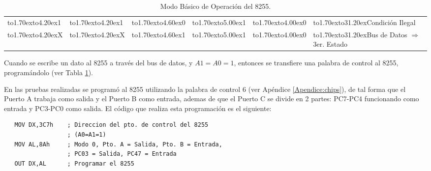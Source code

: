 \begin{table}[!htb]
\begin{tabular}{|l|l|l|l|l|l|}
\cline{1-6}
\vbox to1.70ex{\vspace{1pt}\vfil\hbox to4.20ex{\hfil 1\hfil}\vfil} & 
\vbox to1.70ex{\vspace{1pt}\vfil\hbox to4.20ex{\hfil 1\hfil}\vfil} & 
\vbox to1.70ex{\vspace{1pt}\vfil\hbox to4.60ex{\hfil 0\hfil}\vfil} & 
\vbox to1.70ex{\vspace{1pt}\vfil\hbox to5.00ex{\hfil 1\hfil}\vfil} & 
\vbox to1.70ex{\vspace{1pt}\vfil\hbox to4.00ex{\hfil 0\hfil}\vfil} & 
\vbox to1.70ex{\vspace{1pt}\vfil\hbox to31.20ex{\hfil Condici\'on Ilegal\hfil}\vfil} %
\\

\cline{1-6}
\vbox to1.70ex{\vspace{1pt}\vfil\hbox to4.20ex{\hfil X\hfil}\vfil} & 
\vbox to1.70ex{\vspace{1pt}\vfil\hbox to4.20ex{\hfil X\hfil}\vfil} & 
\vbox to1.70ex{\vspace{1pt}\vfil\hbox to4.60ex{\hfil 1\hfil}\vfil} & 
\vbox to1.70ex{\vspace{1pt}\vfil\hbox to5.00ex{\hfil 1\hfil}\vfil} & 
\vbox to1.70ex{\vspace{1pt}\vfil\hbox to4.00ex{\hfil 0\hfil}\vfil} & 
\vbox to1.70ex{\vspace{1pt}\vfil\hbox to31.20ex{\hfil Bus de Datos $\Longrightarrow$ %
3er. Estado\hfil}\vfil} \\

\cline{1-6}
\end{tabular}
\caption{Modo B\'asico de Operaci\'on del 8255.}
\label{Tabla:program8255}
\end{table}

Cuando se escribe un dato al 8255 a trav\'es del bus de datos, y $A1 = A0 = 1$, entonces se %
transfiere una palabra de control al 8255, program\'andolo (ver Tabla %
\ref{Tabla:program8255}).

En las pruebas realizadas se program\'o al 8255 utilizando la palabra de control 6 (ver %
Ap\'endice \ref{Apendice:chips}), de tal forma que el Puerto A trabaja como salida y el Puerto %
B como entrada, ademas de que el Puerto C se divide en 2 partes: PC7-PC4 funcionando como %
entrada y PC3-PC0 como salida. El c\'odigo que realiza esta programaci\'on es el siguiente:

\begin{verbatim}
   MOV DX,3C7h    ; Direccion del pto. de control del 8255    
                  ; (A0=A1=1)
   MOV AL,8Ah     ; Modo 0, Pto. A = Salida, Pto. B = Entrada, 
                  ; PC03 = Salida, PC47 = Entrada
   OUT DX,AL      ; Programar el 8255
\end{verbatim}

